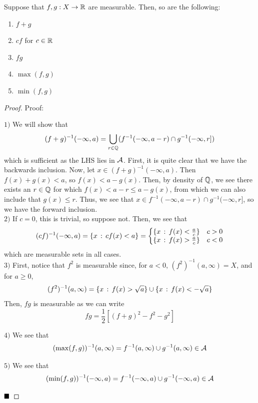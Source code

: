 \begin{lemma}
    Suppose that $f, g : X \to \R$ are measurable. Then, so are the following:
    \begin{enumerate}
        \item $f + g$
        \item $cf$ for $c \in \R$
        \item $fg$
        \item $\max(f, g)$
        \item $\min(f, g)$
    \end{enumerate}
\end{lemma}
\begin{proof}{Proof:}
    
    $1)$ We will show that
    \[ (f + g)^{-1}(-\infty, a) = \bigcup_{r \in \Q}(f^{-1}(-\infty, a - r) \cap g^{-1}(-\infty, r]) \]
    which is sufficient as the LHS lies in $\cal{A}$. First, it is quite clear that we have the backwards inclusion. Now, let $x \in (f + g)^{-1}(-\infty, a)$. Then $f(x) + g(x) < a$, so $f(x) < a - g(x)$. Then, by density of $\Q$, we see there exists an $r \in \Q$ for which $f(x) < a - r \leq a - g(x)$, from which we can also include that $g(x) \leq r$. Thus, we see that $x \in f^{-1}(-\infty, a - r) \cap g^{-1}(-\infty, r]$, so we have the forward inclusion.\\

    $2)$ If $c = 0$, this is trivial, so suppose not. Then, we see that
    \[ (cf)^{-1}(-\infty, a) = \{x \col cf(x) < a\} = \left\{\begin{matrix} \{x \col f(x) < \frac{a}{c}\} & c > 0 \\ \{x \col f(x) > \frac{a}{c}\} & c < 0\end{matrix}\right. \]
    which are measurable sets in all cases.\\

    $3)$ First, notice that $f^2$ is measurable since, for $a < 0$, $(f^2)^{-1}(a, \infty) = X$, and for $a \geq 0$, 
    \[ (f^2)^{-1}(a, \infty) = \{x \col f(x) > \sqrt{a}\} \cup \{x \col f(x) < -\sqrt{a}\} \]
    Then, $fg$ is measurable as we can write
    \[ fg = \frac{1}{2}\left[(f + g)^2 - f^2 - g^2\right] \]

    $4)$ We see that
    \[ (\max(f, g))^{-1}(a, \infty) = f^{-1}(a, \infty) \cup g^{-1}(a, \infty) \in \cal{A} \]

    $5)$ We see that
    \[ (\min(f, g))^{-1}(-\infty, a) = f^{-1}(-\infty, a) \cup g^{-1}(-\infty, a) \in \cal{A} \]

    $\qed$

\end{proof}

